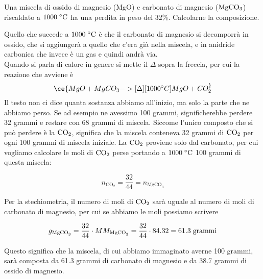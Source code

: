 \begin{esercizio}
    Una miscela di ossido di magnesio (MgO) e carbonato di magnesio ($\rm MgCO_3$) riscaldato a $1000 \; ^{\circ} \rm C$ ha una perdita in peso del 32\%. Calcolarne la composizione.
\end{esercizio}
\begin{soluzione}
    Quello che succede a $1000 \; ^{\circ} \rm C$ è che il carbonato di magnesio si decomporrà in ossido, che si aggiungerà a quello che c'era già nella miscela, e in anidride carbonica che invece è un gas e quindi andrà via.\\
    Quando si parla di calore in genere si mette il $\Delta$ sopra la freccia, per cui la reazione che avviene è
    \begin{equation*}
        \ce{MgO + MgCO_3 ->[{\Delta}][{1000 ^{\circ}C}] MgO + CO_2 ^}
    \end{equation*}
    Il testo non ci dice quanta sostanza abbiamo all'inizio, ma solo la parte che ne abbiamo perso. Se ad esempio ne avessimo 100 grammi, significherebbe perdere 32 grammi e restare con 68 grammi di miscela. Siccome l'unico composto che si può perdere è la $\rm CO_2$, significa che la miscela conteneva 32 grammi di $\rm CO_2$ per ogni 100 grammi di miscela iniziale. La $\rm CO_2$ proviene solo dal carbonato, per cui vogliamo calcolare le moli di $\rm CO_2$ perse portando a $1000 \; ^{\circ} \rm C$ 100 grammi di questa miscela:

$$n_{\text{CO}_2}=\frac{32}{44}=n_{\text{MgCO}_3}$$

Per la stechiometria, il numero di moli di $\rm CO_2$ sarà uguale al numero di moli di carbonato di magnesio, per cui se abbiamo le moli possiamo scrivere

$$g_{\text{MgCO}_3}=\frac{32}{44} \cdot MM_{\text{MgCO}_3}
=\frac{32}{44} \cdot 84.32=61.3 \; \rm grammi$$

Questo significa che la miscela, di cui abbiamo immaginato averne 100 grammi, sarà composta da 61.3 grammi di carbonato di magnesio e da 38.7 grammi di ossido di magnesio.

\end{soluzione}

\newpage

